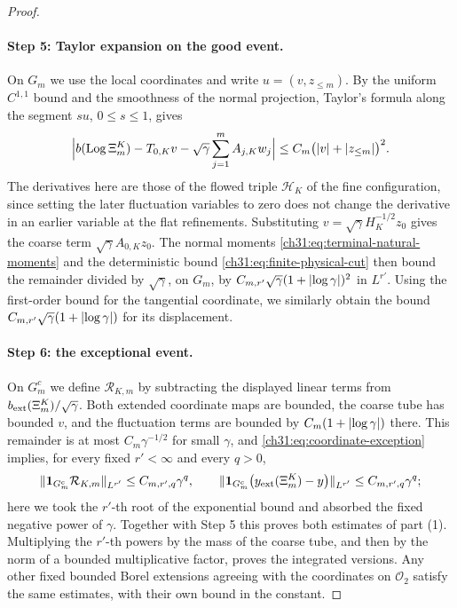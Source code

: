 \begin{proof}
\paragraph{Step 5: Taylor expansion on the good event.}
On $G_m$ we use the local coordinates and write $u=(v,z_{\le m})$. By the uniform $C^{1,1}$ bound and the smoothness of the normal projection, Taylor's formula along the segment $su$, $0\le s\le1$, gives
\begin{equation}\label{ch31:eq:nonlinear-taylor}
 \Bigl\lvert b(\operatorname{Log}\Xi_m^K)-T_{0,K}v-\sqrt\gamma\sum_{j=1}^mA_{j,K}w_j\Bigr\rvert\le C_m\bigl(\lvert v\rvert+\lvert z_{\le m}\rvert\bigr)^2.
\end{equation}
The derivatives here are those of the flowed triple $\mathscr H_K$ of the fine configuration, since setting the later fluctuation variables to zero does not change the derivative in an earlier variable at the flat refinements. Substituting $v=\sqrt\gamma H_K^{-1/2}z_0$ gives the coarse term $\sqrt\gamma A_{0,K}z_0$. The normal moments \eqref{ch31:eq:terminal-natural-moments} and the deterministic bound \eqref{ch31:eq:finite-physical-cut} then bound the remainder divided by $\sqrt\gamma$, on $G_m$, by $C_{m,r'}\sqrt\gamma(1+\lvert \log\gamma\rvert)^2$ in $L^{r'}$. Using the first-order bound for the tangential coordinate, we similarly obtain the bound $C_{m,r'}\sqrt\gamma(1+\lvert \log\gamma\rvert)$ for its displacement.

\paragraph{Step 6: the exceptional event.}
On $G_m^c$ we define $\mathcal R_{K,m}$ by subtracting the displayed linear terms from $b_{\rm ext}(\Xi_m^K)/\sqrt\gamma$. Both extended coordinate maps are bounded, the coarse tube has bounded $v$, and the fluctuation terms are bounded by $C_m(1+\lvert \log\gamma\rvert)$ there. This remainder is at most $C_m\gamma^{-1/2}$ for small $\gamma$, and \eqref{ch31:eq:coordinate-exception} implies, for every fixed $r'<\infty$ and every $q>0$,
\[
 \lVert \mathbf 1_{G_m^c}\mathcal R_{K,m}\rVert_{L^{r'}}\le C_{m,r',q}\gamma^q,\qquad
 \lVert \mathbf 1_{G_m^c}\bigl(y_{\rm ext}(\Xi_m^K)-y\bigr)\rVert_{L^{r'}}\le C_{m,r',q}\gamma^q;
\]
here we took the $r'$-th root of the exponential bound and absorbed the fixed negative power of $\gamma$. Together with Step 5 this proves both estimates of part (1). Multiplying the $r'$-th powers by the mass of the coarse tube, and then by the norm of a bounded multiplicative factor, proves the integrated versions. Any other fixed bounded Borel extensions agreeing with the coordinates on $\mathcal O_2$ satisfy the same estimates, with their own bound in the constant.


\end{proof}
